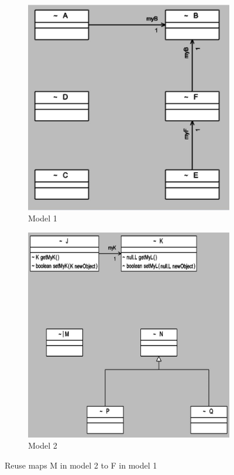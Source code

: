 \begin{figure}
	\centering
    \begin{subfigure}[b]{.4\linewidth}
    	\includegraphics[width=\linewidth]{reuse1}
        \caption{Model 1}
    \end{subfigure}
    \begin{subfigure}[b]{.4\linewidth}
    	\includegraphics[width=\linewidth]{reuse2}
        \caption{Model 2}
    \end{subfigure}
	\caption{Reuse maps M in model 2 to F in model 1}
    \label{figure : sample}
\end{figure}

